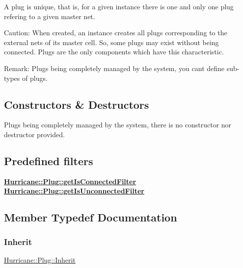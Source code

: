 A plug is unique, that is, for a given instance there is one and only one plug refering to a given master net.

\begin{DoxyParagraph}{Caution\+: When created, an instance creates all plugs corresponding to }
the external nets of its master cell. So, some plugs may exist without being connected. Plugs are the only components which have this characteristic.
\end{DoxyParagraph}
\begin{DoxyParagraph}{Remark\+: Plugs being completely managed by the system, you can\textquotesingle{}t }
define sub-\/types of plugs.
\end{DoxyParagraph}
\hypertarget{classHurricane_1_1Plug_secPlugConstructors}{}\subsection{Constructors \& Destructors}\label{classHurricane_1_1Plug_secPlugConstructors}
Plugs being completely managed by the system, there is no constructor nor destructor provided.\hypertarget{classHurricane_1_1Plug_secPlugPredefinedFilters}{}\subsection{Predefined filters}\label{classHurricane_1_1Plug_secPlugPredefinedFilters}
{\bfseries \mbox{\hyperlink{classHurricane_1_1Plug_a51bd5d04a337544709950d7cace05f0d}{Hurricane\+::\+Plug\+::get\+Is\+Connected\+Filter}}} {\bfseries \mbox{\hyperlink{classHurricane_1_1Plug_af27b873ed2420329a63ea67dcc243f07}{Hurricane\+::\+Plug\+::get\+Is\+Unconnected\+Filter}}} 

\subsection{Member Typedef Documentation}
\mbox{\label{classHurricane_1_1Plug_a71bee60105cbd9fdc5f0f2e5b793eeca}} 
\subsubsection{\texorpdfstring{Inherit}{Inherit}}
{\footnotesize\ttfamily \mbox{\hyperlink{classHurricane_1_1Plug_a71bee60105cbd9fdc5f0f2e5b793eeca}{Hurricane\+::\+Plug\+::\+Inherit}}}


